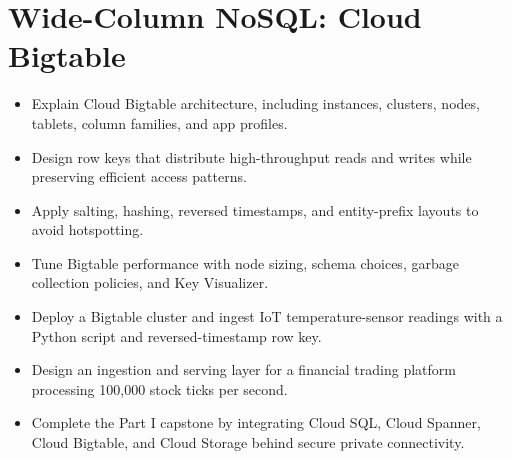 \chapter{Wide-Column NoSQL: Cloud Bigtable}

\begin{objectives}
\begin{itemize}
    \item Explain Cloud Bigtable architecture, including instances, clusters, nodes, tablets, column families, and app profiles.
    \item Design row keys that distribute high-throughput reads and writes while preserving efficient access patterns.
    \item Apply salting, hashing, reversed timestamps, and entity-prefix layouts to avoid hotspotting.
    \item Tune Bigtable performance with node sizing, schema choices, garbage collection policies, and Key Visualizer.
    \item Deploy a Bigtable cluster and ingest IoT temperature-sensor readings with a Python script and reversed-timestamp row key.
    \item Design an ingestion and serving layer for a financial trading platform processing 100,000 stock ticks per second.
    \item Complete the Part I capstone by integrating Cloud SQL, Cloud Spanner, Cloud Bigtable, and Cloud Storage behind secure private connectivity.
\end{itemize}
\end{objectives}

